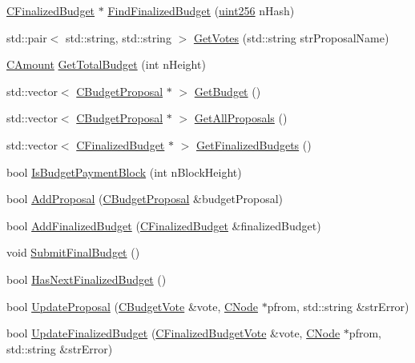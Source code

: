 \begin{DoxyCompactItemize}
\item 
\hyperlink{class_c_finalized_budget}{C\+Finalized\+Budget} $\ast$ \hyperlink{class_c_budget_manager_a26ebbe767534cce413810d7e7a1bf78c}{Find\+Finalized\+Budget} (\hyperlink{classuint256}{uint256} n\+Hash)
\item 
std\+::pair$<$ std\+::string, std\+::string $>$ \hyperlink{class_c_budget_manager_a71b8c43385a284f15398074617fa4104}{Get\+Votes} (std\+::string str\+Proposal\+Name)
\item 
\hyperlink{amount_8h_a4eaf3a5239714d8c45b851527f7cb564}{C\+Amount} \hyperlink{class_c_budget_manager_a3c6bc6278e7f394b6bfabbe757466e70}{Get\+Total\+Budget} (int n\+Height)
\item 
std\+::vector$<$ \hyperlink{class_c_budget_proposal}{C\+Budget\+Proposal} $\ast$ $>$ \hyperlink{class_c_budget_manager_acba591312f675bd37692e69410ff5735}{Get\+Budget} ()
\item 
std\+::vector$<$ \hyperlink{class_c_budget_proposal}{C\+Budget\+Proposal} $\ast$ $>$ \hyperlink{class_c_budget_manager_af2e50d4662f6c18b7ac7e26b021adc6c}{Get\+All\+Proposals} ()
\item 
std\+::vector$<$ \hyperlink{class_c_finalized_budget}{C\+Finalized\+Budget} $\ast$ $>$ \hyperlink{class_c_budget_manager_ab806fb2d22db385f22bc9655e09b2944}{Get\+Finalized\+Budgets} ()
\item 
bool \hyperlink{class_c_budget_manager_a1011c9399df614e09f77d87ebe4f7bca}{Is\+Budget\+Payment\+Block} (int n\+Block\+Height)
\item 
bool \hyperlink{class_c_budget_manager_a0338c710edb15b7c1b0818a98d085ead}{Add\+Proposal} (\hyperlink{class_c_budget_proposal}{C\+Budget\+Proposal} \&budget\+Proposal)
\item 
bool \hyperlink{class_c_budget_manager_a3639ad9a2b26e5d7611f55bbb79723d7}{Add\+Finalized\+Budget} (\hyperlink{class_c_finalized_budget}{C\+Finalized\+Budget} \&finalized\+Budget)
\item 
void \hyperlink{class_c_budget_manager_af60a5c7536d47606f0efdd475e5d171a}{Submit\+Final\+Budget} ()
\item 
bool \hyperlink{class_c_budget_manager_a6ec491bb3f9b9772144fff7c458e75a8}{Has\+Next\+Finalized\+Budget} ()
\item 
bool \hyperlink{class_c_budget_manager_a643d564d0232ed6f9e6ca025b8377c13}{Update\+Proposal} (\hyperlink{class_c_budget_vote}{C\+Budget\+Vote} \&vote, \hyperlink{class_c_node}{C\+Node} $\ast$pfrom, std\+::string \&str\+Error)
\item 
bool \hyperlink{class_c_budget_manager_a4ac3207b673d7163a7d03005e35d6f8b}{Update\+Finalized\+Budget} (\hyperlink{class_c_finalized_budget_vote}{C\+Finalized\+Budget\+Vote} \&vote, \hyperlink{class_c_node}{C\+Node} $\ast$pfrom, std\+::string \&str\+Error)

\end{DoxyCompactItemize}
